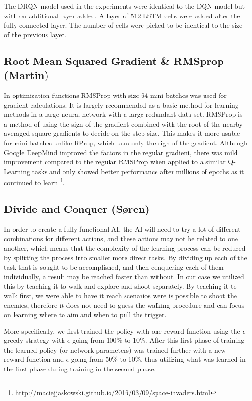 \documentclass{article}
\begin{document}
The DRQN model used in the experiments were identical to the DQN model but with on additional layer added. A layer of 512 LSTM cells were added after the fully connected layer. The number of cells were picked to be identical to the size of the previous layer. 

\subsection{Root Mean Squared Gradient \& RMSprop (Martin)}
In optimization functions RMSProp with size 64 mini batches was used for gradient calculations. It is largely recommended as a basic method for learning methods in a large neural network with a large redundant data set. RMSProp is a method of using the sign of the gradient combined with the root of the nearby averaged square gradients to decide on the step size. This makes it more usable for mini-batches unlike RProp, which uses only the sign of the gradient. 
Although Google DeepMind improved the factors in the regular gradient, there was mild improvement compared to the regular RMSProp when applied to a similar Q-Learning tasks and only showed better performance after millions of epochs as it continued to learn \cite{kurekdeep} \footnote{http://maciejjaskowski.github.io/2016/03/09/space-invaders.html}. 



\subsection{Divide and Conquer (Søren)}
In order to create a fully functional AI, the AI will need to try a lot of different combinations for different actions, and these actions may not be related to one another, which means that the complexity of the learning process can be reduced by splitting the process into smaller more direct tasks. By dividing up each of the task that is sought to be accomplished, and then conquering each of them individually, a result may be reached faster than without. In our case we utilized this by teaching it to walk and explore and shoot separately. By teaching it to walk first, we were able to have it reach scenarios were is possible to shoot the enemies, therefore it does not need to guess the walking procedure and can focus on learning where to aim and when to pull the trigger.

More specifically, we first trained the policy with one reward function using the $\epsilon$-greedy strategy with $\epsilon$ going from 100\% to 10\%. After this first phase of training the learned policy (or network parameters) was trained further with a new reward function and $\epsilon$ going from 50\% to 10\%, thus utilizing what was learned in the first phase during training in the second phase.
\end{document}
